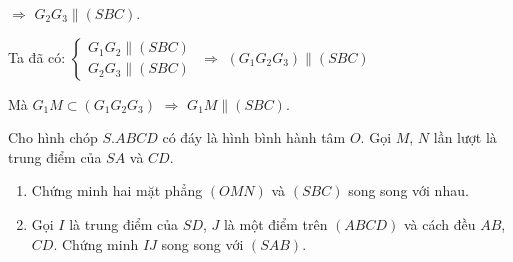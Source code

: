 \begin{vd}
{		$\Rightarrow$ $G_2G_3 \parallel (SBC)$.
		
		Ta đã có: $\begin{cases} G_1G_2 \parallel (SBC) \\ G_2G_3 \parallel (SBC) \end{cases}$ $\Rightarrow$ $(G_1G_2G_3) \parallel (SBC)$ 
		
		Mà $G_1M \subset (G_1G_2G_3)$ $\Rightarrow$ $G_1M \parallel (SBC)$.
	}
\end{vd}

\begin{vd}%
	Cho hình chóp $S.ABCD$ có đáy là hình bình hành tâm $O$. Gọi $M$, $N$ lần lượt là trung điểm của $SA$ và $CD$.
	\begin{enumerate}
		\item Chứng minh hai mặt phẳng $(OMN)$ và $(SBC)$ song song với nhau.
		\item Gọi $I$ là trung điểm của $SD$, $J$ là một điểm trên $(ABCD)$ và cách đều $AB$, $CD$. Chứng minh $IJ$ song song với $(SAB)$.
		\end{enumerate}
\end{vd}
